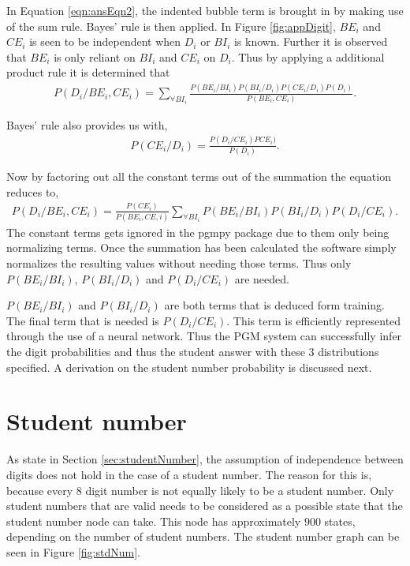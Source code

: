 In Equation \ref{eqn:ansEqn2}, the indented bubble term is brought in by making use of the sum rule. Bayes' rule is then applied. In Figure \ref{fig:appDigit}, $BE_i$ and $CE_i$ is seen to be independent when $D_i$ or $BI_i$ is known. Further it is observed that $BE_i$ is only reliant on $BI_i$ and $CE_i$ on $D_i$. Thus by applying a additional product rule it is determined that
\begin{align}
  P(D_i/BE_i,CE_i) =  \sum_{\forall BI_i}^{}\frac{P(BE_i/BI_i)P(BI_i/D_i)P(CE_i/D_i)P(D_i)}{P(BE_i,CE_i)}.
\label{eqn:ansEqn3}
\end{align}

Bayes' rule also provides us with,
\begin{align}
  P(CE_i/D_i)	=  \frac{P(D_i/CE_i)PCE_i)}{P(D_i)}.
\label{eqn:ansEqn4}
\end{align}

Now by factoring out all the constant terms out of the summation the equation reduces to,
\begin{align}
  P(D_i/BE_i,CE_i) =  \frac{P(CE_i)}{P(BE_i,CE,i)}\sum_{\forall BI_i}^{}P(BE_i/BI_i)P(BI_i/D_i)P(D_i/CE_i).
\label{eqn:ansEqn5}
\end{align}
The constant terms gets ignored in the pgmpy package due to them only being normalizing terms. Once the summation has been calculated the software simply normalizes the resulting values without needing those terms. Thus only $P(BE_i/BI_i)$, $P(BI_i/D_i)$ and $P(D_i/CE_i)$ are needed.

$P(BE_i/BI_i)$ and  $P(BI_i/D_i)$ are both terms that is deduced form training. The final term that is needed is $P(D_i/CE_i)$. This term is efficiently represented through the use of a neural network. Thus the PGM system can successfully infer the digit probabilities and thus the student answer with these 3 distributions specified. A derivation on the student number probability is discussed next.

\section{Student number}
As state in Section \ref{sec:studentNumber}, the assumption of independence between digits does not hold in the case of a student number. The reason for this is, because every 8 digit number is not equally likely to be a student number. Only student numbers that are valid needs to be considered as a possible state that the student number node can take. This node has approximately $900$ states, depending on the number of student numbers. The student number graph can be seen in Figure \ref{fig:stdNum}. 

